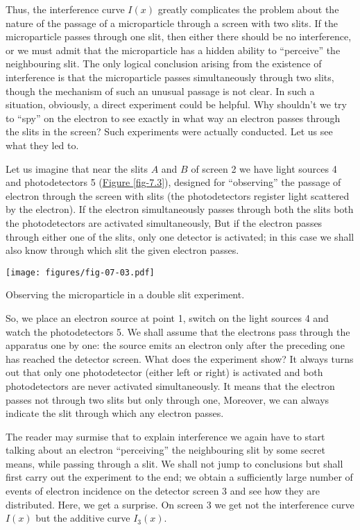 \documentclass[a4paper,sfsidenotes,colorlinks=true]{tufte-book}
\numberwithin{equation}{section}
\numberwithin{figure}{section}
\begin{document}
Thus, the interference curve $I(x)$ greatly complicates the problem about the nature of the passage of a microparticle through a screen with two slits. If the microparticle passes through one slit, then either there should be no interference, or we must admit that the microparticle has a hidden ability to ``perceive'' the neighbouring slit. The only logical conclusion arising from the existence of interference is that the microparticle passes simultaneously through two slits, though the mechanism of such an unusual passage is not clear. In such a situation, obviously, a direct experiment could be helpful. Why shouldn't we try to ``spy'' on the electron to see exactly in what way an electron passes through the slits in the screen? Such experiments were actually conducted. Let us see what they led to.

Let  us imagine that near the slits $A$ and $B$ of screen \textsf{2} we have light sources \textsf{4} and photodetectors \textsf{5} (\hyperref[fig-7.3]{Figure \ref{fig-7.3}}), designed for ``observing'' the passage of electron through the screen with slits (the photodetectors register light scattered by the electron). If the electron simultaneously passes through both the slits both the photodetectors are activated simultaneously, But if the electron passes through either one of the slits, only one detector is activated; in this case we shall also know through which slit the given electron passes. 


\begin{marginfigure}[1cm]
\centering
\texttt{[image: figures/fig-07-03.pdf]}
\caption{Observing the microparticle in a double slit experiment.}
\label{fig-7.3}
\end{marginfigure}


So, we place an electron source at point \textsf{1}, switch on the light sources \textsf{4} and watch the photodetectors \textsf{5}.
We shall assume that the electrons pass through the apparatus one by one: the source emits an electron only after the preceding one has reached the detector screen. What does the experiment show? It always turns out that only one photodetector (either left or right) is activated and both photodetectors are never activated simultaneously. It means that the electron passes not through two slits but only through one, Moreover, we can always indicate the slit through which any electron passes.


The reader may surmise that to explain interference we again have to start talking about an electron ``perceiving'' the neighbouring slit by some secret means, while passing through a slit. We shall not jump to conclusions but shall first carry out the experiment to the end; we obtain a sufficiently large number of events of electron incidence on the detector screen \textsf{3} and see how they are distributed. Here, we get a surprise. On screen \textsf{3} we get not the interference curve $I(x)$ but the additive curve $I_{3}(x)$.
\end{document}
